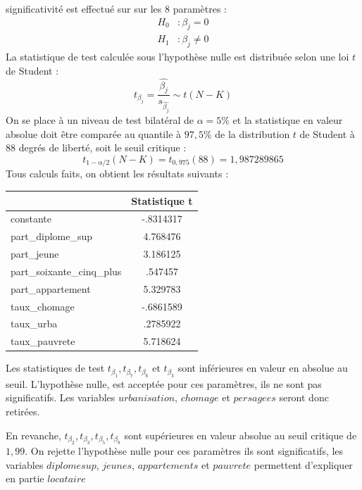 \documentclass{article}
\begin{document}
significativité est effectué sur sur les $8$ paramètres :
\begin{equation*}
\begin{split}
    H_0 &: \beta_j =0 \\
    H_1 &: \beta_j \neq 0
\end{split}
\end{equation*}
La statistique de test calculée sous l'hypothèse nulle est distribuée selon une loi $t$ de Student : 
\begin{equation*}
    t_{\beta_j} = \frac{\hat{\beta_j}}{s_{\hat{\beta_j}}} \sim t(N-K)
\end{equation*}
On se place à un niveau de test bilatéral de $\alpha = 5\%$ et la statistique en valeur absolue doit être comparée au quantile à $97,5\%$ de la distribution
 $t$ de Student à $88$ degrés de liberté, soit le seuil critique :
\begin{equation*}
    t_{1-\alpha/2}(N-K) = t_{0,975}(88) = 1,987289865 
\end{equation*}
Tous calculs faits, on obtient les résultats suivants :
\begin{table}[H]
\centering
\begin{tabular}{l*{1}{c}}
\toprule
            &Statistique t\\
\midrule
constante      &   -.8314317\\
part\_diplome\_sup&    4.768476\\
part\_jeune  &    3.186125\\
part\_soixante\_cinq\_plus&     .547457\\
part\_appartement&    5.329783\\
taux\_chomage&   -.6861589\\
taux\_urba   &    .2785922\\
taux\_pauvrete&    5.718624\\
\bottomrule
\end{tabular}
\end{table}
Les statistiques de test $t_{\beta_1},t_{\beta_7},t_{\beta_6}$ et $t_{\beta_3}$ sont inférieures en valeur en absolue au seuil. L'hypothèse nulle, est
acceptée pour ces paramètres, ils ne sont pas significatifs. Les variables $urbanisation$, $chomage$ et $persagees$ seront donc retirées.

En revanche, $t_{\beta_2}, t_{\beta_3}, t_{\beta_5}, t_{\beta_8}$ sont supérieures en valeur absolue au seuil critique de $1,99$. On rejette l'hypothèse nulle pour ces paramètres
ils sont significatifs, les variables $diplomesup$, $jeunes$, $appartements$ et $pauvrete$ permettent d'expliquer en partie $locataire$
\end{document}
